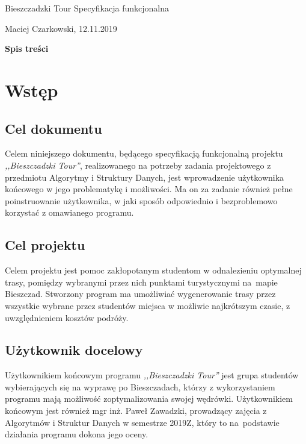 \documentclass[12pt,a4paper]{article}
\begin{document}
\begin{titlepage}
\vspace*{\fill}
\begin{center}
{\fontsize{50}{0.1}\selectfont Bieszczadzki Tour}
\huge Specyfikacja funkcjonalna
\end{center}
\vspace*{\fill}
\begin{center}
Maciej Czarkowski, 12.11.2019
\end{center}
\end{titlepage}
\clearpage
\hspace{1cm}
\begin{center}
\LARGE\textbf{Spis treści}
\end{center}
\tableofcontents
\clearpage
\section{Wstęp}
\subsection{Cel dokumentu}
Celem niniejszego dokumentu, będącego specyfikacją funkcjonalną projektu \textsl{,,Bieszczadzki Tour''}, realizowanego na potrzeby zadania projektowego z przedmiotu Algorytmy i Struktury Danych, jest wprowadzenie użytkownika końcowego w jego problematykę i możliwości. Ma on za zadanie również pełne poinstruowanie użytkownika, w jaki sposób odpowiednio i bezproblemowo korzystać z omawianego programu.
\subsection{Cel projektu}
Celem projektu jest pomoc zakłopotanym studentom w odnalezieniu optymalnej trasy, pomiędzy wybranymi przez nich punktami turystycznymi na~mapie Bieszczad. Stworzony program ma umożliwiać wygenerowanie trasy przez wszystkie wybrane przez studentów miejsca w możliwie najkrótszym czasie, z uwzględnieniem kosztów podróży.
\subsection{Użytkownik docelowy}
Użytkownikiem końcowym programu \textsl{,,Bieszczadzki Tour''} jest grupa studentów wybierających się na wyprawę po Bieszczadach, którzy z wykorzystaniem programu mają możliwość zoptymalizowania swojej wędrówki. Użytkownikiem końcowym jest również mgr inż. Paweł Zawadzki, prowadzący zajęcia z Algorytmów i Struktur Danych w semestrze 2019Z, który to na~podstawie działania programu dokona jego oceny.
\newpage
\end{document}
